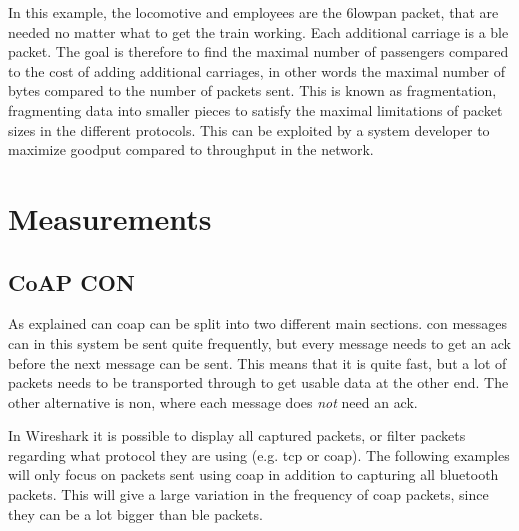 \noindent In this example, the locomotive and employees are the \gls{6lowpan} packet, that are needed no matter what to get the train working. Each additional carriage is a \gls{ble} packet. The goal is therefore to find the maximal number of passengers compared to the cost of adding additional carriages, in other words the maximal number of bytes compared to the number of packets sent. This is known as fragmentation, fragmenting data into smaller pieces to satisfy the maximal limitations of packet sizes in the different protocols. This can be exploited by a system developer to maximize \gls{goodput} compared to \gls{throughput} in the network.
 
\newpage

\section{Measurements}

\subsection{CoAP CON}

\noindent As explained can \gls{coap} can be split into two different main sections. \gls{con} messages can in this system be sent quite frequently, but every message needs to get an \gls{ack} before the next message can be sent. This means that it is quite fast, but a lot of packets needs to be transported through to get usable data at the other end. The other alternative is \gls{non}, where each message does \textit{not} need an \gls{ack}. 






\noindent In Wireshark it is possible to display all captured packets, or filter packets regarding what protocol they are using (e.g. \gls{tcp} or \gls{coap}). The following examples will only focus on packets sent using \gls{coap} in addition to capturing all bluetooth packets. This will give a large variation in the frequency of \gls{coap} packets, since they can be a lot bigger than \gls{ble} packets. 

